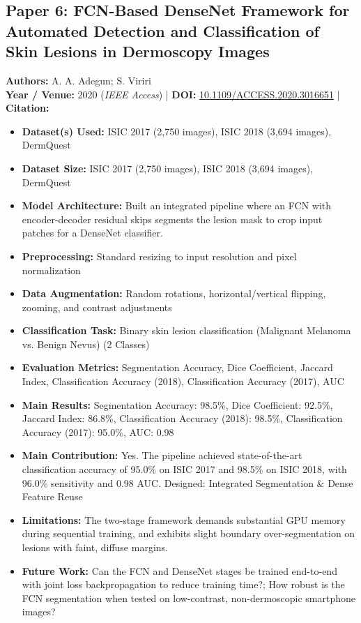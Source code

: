 \documentclass[11pt,a4paper]{article}
\begin{document}
\subsection{Paper 6: FCN-Based DenseNet Framework for Automated Detection and Classification of Skin Lesions in Dermoscopy Images}
\textbf{Authors:} A. A. Adegun; S. Viriri \\
\textbf{Year / Venue:} 2020 (\textit{IEEE Access}) | \textbf{DOI:} \href{https://doi.org/10.1109/ACCESS.2020.3016651}{10.1109/ACCESS.2020.3016651} | \textbf{Citation:} \cite{9167192}

\begin{itemize}\small
\item \textbf{Dataset(s) Used:} ISIC 2017 (2,750 images), ISIC 2018 (3,694 images), DermQuest
\item \textbf{Dataset Size:} ISIC 2017 (2,750 images), ISIC 2018 (3,694 images), DermQuest
\item \textbf{Model Architecture:} Built an integrated pipeline where an FCN with encoder-decoder residual skips segments the lesion mask to crop input patches for a DenseNet classifier.
\item \textbf{Preprocessing:} Standard resizing to input resolution and pixel normalization
\item \textbf{Data Augmentation:} Random rotations, horizontal/vertical flipping, zooming, and contrast adjustments
\item \textbf{Classification Task:} Binary skin lesion classification (Malignant Melanoma vs. Benign Nevus) (2 Classes)
\item \textbf{Evaluation Metrics:} Segmentation Accuracy, Dice Coefficient, Jaccard Index, Classification Accuracy (2018), Classification Accuracy (2017), AUC
\item \textbf{Main Results:} Segmentation Accuracy: 98.5\%, Dice Coefficient: 92.5\%, Jaccard Index: 86.8\%, Classification Accuracy (2018): 98.5\%, Classification Accuracy (2017): 95.0\%, AUC: 0.98
\item \textbf{Main Contribution:} Yes. The pipeline achieved state-of-the-art classification accuracy of 95.0\% on ISIC 2017 and 98.5\% on ISIC 2018, with 96.0\% sensitivity and 0.98 AUC. Designed: Integrated Segmentation \& Dense Feature Reuse
\item \textbf{Limitations:} The two-stage framework demands substantial GPU memory during sequential training, and exhibits slight boundary over-segmentation on lesions with faint, diffuse margins.
\item \textbf{Future Work:} Can the FCN and DenseNet stages be trained end-to-end with joint loss backpropagation to reduce training time?; How robust is the FCN segmentation when tested on low-contrast, non-dermoscopic smartphone images?

\end{itemize}
\end{document}

